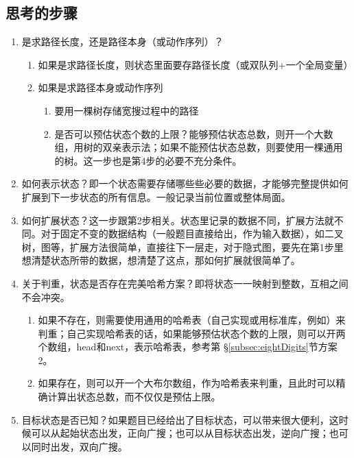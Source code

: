 \subsection{思考的步骤}
\begin{enumerate}
\item 是求路径长度，还是路径本身（或动作序列）？
    \begin{enumerate}
    \item 如果是求路径长度，则状态里面要存路径长度（或双队列+一个全局变量）
    \item 如果是求路径本身或动作序列
        \begin{enumerate}
            \item 要用一棵树存储宽搜过程中的路径
            \item 是否可以预估状态个数的上限？能够预估状态总数，则开一个大数组，用树的双亲表示法；如果不能预估状态总数，则要使用一棵通用的树。这一步也是第4步的必要不充分条件。
        \end{enumerate}
    \end{enumerate}

\item 如何表示状态？即一个状态需要存储哪些些必要的数据，才能够完整提供如何扩展到下一步状态的所有信息。一般记录当前位置或整体局面。

\item 如何扩展状态？这一步跟第2步相关。状态里记录的数据不同，扩展方法就不同。对于固定不变的数据结构（一般题目直接给出，作为输入数据），如二叉树，图等，扩展方法很简单，直接往下一层走，对于隐式图，要先在第1步里想清楚状态所带的数据，想清楚了这点，那如何扩展就很简单了。

\item 关于判重，状态是否存在完美哈希方案？即将状态一一映射到整数，互相之间不会冲突。
    \begin{enumerate}
    \item 如果不存在，则需要使用通用的哈希表（自己实现或用标准库，例如）来判重；自己实现哈希表的话，如果能够预估状态个数的上限，则可以开两个数组，head和next，表示哈希表，参考第 \S \ref{subsec:eightDigits}节方案2。
    \item 如果存在，则可以开一个大布尔数组，作为哈希表来判重，且此时可以精确计算出状态总数，而不仅仅是预估上限。
    \end{enumerate}

\item 目标状态是否已知？如果题目已经给出了目标状态，可以带来很大便利，这时候可以从起始状态出发，正向广搜；也可以从目标状态出发，逆向广搜；也可以同时出发，双向广搜。
\end{enumerate}


